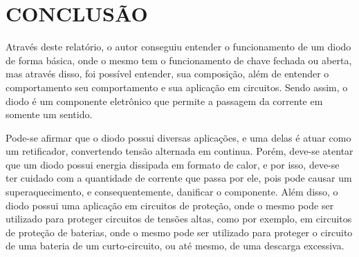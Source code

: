 \chapter{CONCLUSÃO}

Através deste relatório, o autor conseguiu entender o funcionamento de um diodo de forma básica, onde o mesmo tem o funcionamento de chave fechada ou aberta, mas através disso, foi possível entender, sua composição, além de entender o comportamento seu comportamento e sua aplicação em circuitos. Sendo assim, o diodo é um componente eletrônico que permite a passagem da corrente em somente um sentido.

Pode-se afirmar que o diodo possui diversas aplicações, e uma delas é atuar como um retificador, convertendo tensão alternada em continua. Porém, deve-se atentar que um diodo possui energia dissipada em formato de calor, e por isso, deve-se ter cuidado com a quantidade de corrente que passa por ele, pois pode causar um superaquecimento, e consequentemente, danificar o componente. Além disso, o diodo possui uma aplicação em circuitos de proteção, onde o mesmo pode ser utilizado para proteger circuitos de tensões altas, como por exemplo, em circuitos de proteção de baterias, onde o mesmo pode ser utilizado para proteger o circuito de uma bateria de um curto-circuito, ou até mesmo, de uma descarga excessiva.